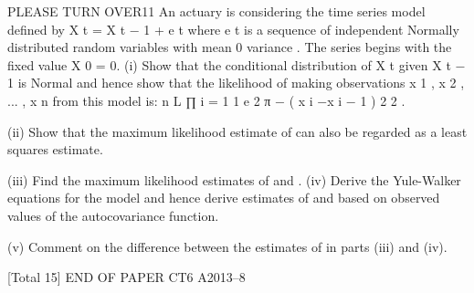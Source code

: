 \documentclass[a4paper,12pt]{article}
\begin{document}
PLEASE TURN OVER11
An actuary is considering the time series model defined by
X t = \alpha X t − 1 + e t
where e t is a sequence of independent Normally distributed random variables with
mean 0 variance  . The series begins with the fixed value X 0 = 0.
(i)
Show that the conditional distribution of X t given X t − 1 is Normal and hence
show that the likelihood of making observations x 1 , x 2 , ... , x n from this model
is:
n
L \propto  ∏
i = 1
1
e
2 π\sigma
−
( x i −\alpha x i − 1 ) 2
2 
.

(ii) Show that the maximum likelihood estimate of \alpha can also be regarded as a
least squares estimate.

(iii) Find the maximum likelihood estimates of \alpha and  .
(iv) Derive the Yule-Walker equations for the model and hence derive estimates of
\alpha and  based on observed values of the autocovariance function.

(v) Comment on the difference between the estimates of \alpha in parts (iii) and (iv).

[Total 15]
END OF PAPER
CT6 A2013–8
\end{document}
